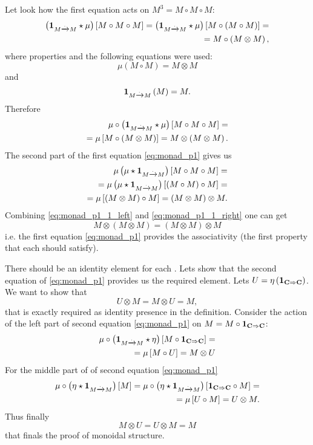 Let look how the first equation acts on $M^3 = M \circ M \circ M$:
\begin{eqnarray}
\left( \mathbf{1}_{ M \xrightarrow{.} M } \star \mu \right) \left[ M \circ M \circ M
\right] = 
\left( \mathbf{1}_{ M \xrightarrow{.} M } \star \mu \right) \left[ M \circ \left( M \circ M \right)
\right] = 
\nonumber \\
= M \circ \left(M \otimes M\right), 
\nonumber
\end{eqnarray}
where properties  and the
following equations were used:
\[
\mu \left(M \circ M\right) = M \otimes M
\]
and
\[
\mathbf{1}_{ M \xrightarrow{.} M }\left(M\right) = M.
\]
Therefore
\begin{eqnarray}
\mu \circ \left( \mathbf{1}_{ M \xrightarrow{.} M } \star \mu \right) \left[ M \circ M \circ M
\right] = 
\nonumber \\
=
\mu \left[M \circ \left(M \otimes M\right)\right] = 
M \otimes \left(M \otimes M\right).
\label{eq:monad_p1_1_left}
\end{eqnarray}
The second part of the first equation \eqref{eq:monad_p1} gives us
\begin{eqnarray}
\mu \left( \mu \star \mathbf{1}_{ M \xrightarrow{.} M } \right) \left[ M \circ M \circ M
\right] = 
\nonumber \\
=
\mu \left( \mu \star \mathbf{1}_{ M \xrightarrow{.} M } \right) \left[ \left(M \circ M\right)
  \circ M \right] = 
\nonumber \\
= \mu \left[\left(M \otimes M\right) \circ M \right] = 
\left(M \otimes M\right) \otimes M. 
\label{eq:monad_p1_1_right}
\end{eqnarray}
Combining \eqref{eq:monad_p1_1_left} and \eqref{eq:monad_p1_1_right}
one can get
\[
M \otimes \left(M \otimes M\right) = 
\left(M \otimes M\right) \otimes M
\]
i.e. the first equation \eqref{eq:monad_p1} provides the associativity
(the first property that each  should satisfy). 

There should be an identity element for each .
Lets show that the second equation of  \eqref{eq:monad_p1} provides us
the required element. Lets $U =
\eta\left(\mathbf{1}_{ \mathbf{C} \Rightarrow \mathbf{C} }\right)$. 
We want to show that 
\begin{equation}
U \otimes M = M \otimes U = M, 
\nonumber
\end{equation}
that is exactly required as identity presence in the
 definition.
Consider the action of the left part of second equation
\eqref{eq:monad_p1} on $M = M \circ \mathbf{1}_{ \mathbf{C} \Rightarrow \mathbf{C} }$:
\begin{eqnarray}
\mu \circ \left( \mathbf{1}_{ M \xrightarrow{.} M } \star \eta \right) \left[M \circ \mathbf{1}_{ \mathbf{C} \Rightarrow \mathbf{C} }\right] = 
\nonumber \\
=
\mu \left[M \circ U\right] = M \otimes U
\nonumber
\end{eqnarray}
For the middle part of  of second equation
\eqref{eq:monad_p1}
\begin{eqnarray}
\mu \circ \left( \eta \star \mathbf{1}_{ M \xrightarrow{.} M } \right) \left[M\right] = 
\mu \circ \left( \eta \star \mathbf{1}_{ M \xrightarrow{.} M } \right) \left[\mathbf{1}_{ \mathbf{C} \Rightarrow \mathbf{C} } \circ M\right] = 
\nonumber \\
=
\mu \left[U \circ M\right] = U \otimes M.
\nonumber
\end{eqnarray}
Thus
finally
\[
M \otimes U = U \otimes M = M
\]
that finals the proof of monoidal structure.

